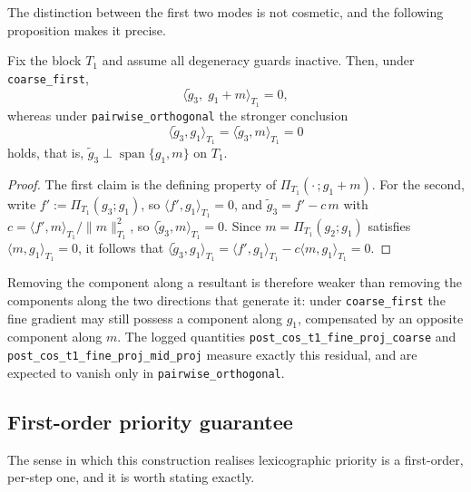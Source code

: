 The distinction between the first two modes is not cosmetic, and the following proposition makes
it precise.

\begin{proposition}
\label{prop:lex_orthogonality}
Fix the block $T_1$ and assume all degeneracy guards inactive. Then, under
\texttt{coarse\_first},
\[
\langle \tilde g_3,\; g_1+m\rangle_{T_1}=0,
\]
whereas under \texttt{pairwise\_orthogonal} the stronger conclusion
\[
\langle \tilde g_3, g_1\rangle_{T_1}=\langle \tilde g_3, m\rangle_{T_1}=0
\]
holds, that is, $\tilde g_3 \perp \operatorname{span}\{g_1,m\}$ on $T_1$.
\end{proposition}
\begin{proof}
The first claim is the defining property of $\Pi_{T_1}(\cdot\,;g_1+m)$. For the second, write
$f' := \Pi_{T_1}(g_3;g_1)$, so $\langle f',g_1\rangle_{T_1}=0$, and
$\tilde g_3 = f' - c\,m$ with $c=\langle f',m\rangle_{T_1}/\lVert m\rVert^2_{T_1}$, so
$\langle \tilde g_3,m\rangle_{T_1}=0$. Since $m=\Pi_{T_1}(g_2;g_1)$ satisfies
$\langle m,g_1\rangle_{T_1}=0$, it follows that
$\langle \tilde g_3,g_1\rangle_{T_1}=\langle f',g_1\rangle_{T_1}-c\langle m,g_1\rangle_{T_1}=0$.
\end{proof}

Removing the component along a resultant is therefore weaker than removing the components along
the two directions that generate it: under \texttt{coarse\_first} the fine gradient may still
possess a component along $g_1$, compensated by an opposite component along $m$. The logged
quantities \texttt{post\_cos\_t1\_fine\_proj\_coarse} and
\texttt{post\_cos\_t1\_fine\_proj\_mid\_proj} measure exactly this residual, and are expected to
vanish only in \texttt{pairwise\_orthogonal}.

\subsection{First-order priority guarantee}
\label{ssec:lex_guarantee}

The sense in which this construction realises lexicographic priority is a first-order,
per-step one, and it is worth stating exactly.

